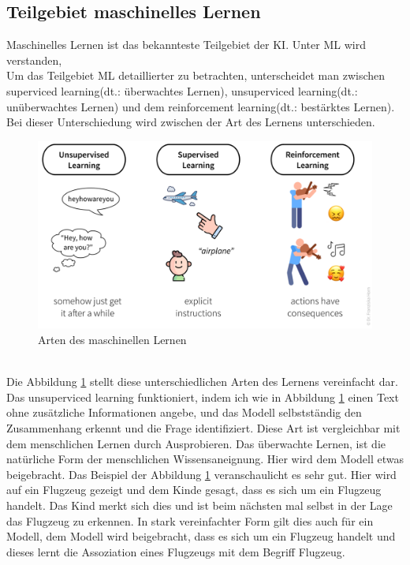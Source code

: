 \begin{onehalfspace}
    \subsection{Teilgebiet maschinelles Lernen}
    \label{subsubsec:teilgebietML}
        Maschinelles Lernen ist das bekannteste Teilgebiet der \ac{KI}. Unter \ac{ML} wird verstanden, 
        \\
        Um das Teilgebiet \ac{ML} detaillierter zu betrachten, unterscheidet man zwischen \glqq{}superviced learning\grqq{}(\ac*{dt}.: überwachtes Lernen), \glqq{}unsuperviced learning\grqq{}(\ac*{dt}.: unüberwachtes Lernen) und dem \glqq{}reinforcement learning\grqq{}(\ac*{dt}.: bestärktes Lernen).\cite{Horn2022}\cite{Datenkommission2019} Bei dieser Unterschiedung wird zwischen der Art des Lernens unterschieden. 
        \\
        \begin{figure}[h]
            \centering
            \includegraphics[width = 12cm]{Bilder/ml_algorithms.png}
            \caption{Arten des maschinellen Lernen\cite{Horn2022}}
            \label{fig:ml_algorithms}
        \end{figure}
        \\
        Die Abbildung \ref*{fig:ml_algorithms} stellt diese unterschiedlichen Arten des Lernens vereinfacht dar. Das unsuperviced learning funktioniert, indem ich wie in Abbildung \ref*{fig:ml_algorithms} einen Text ohne zusätzliche Informationen angebe, und das Modell selbstständig den Zusammenhang erkennt und die Frage identifiziert. Diese Art ist vergleichbar mit dem menschlichen Lernen durch Ausprobieren. 
        Das überwachte Lernen, ist die natürliche Form der menschlichen Wissensaneignung. Hier wird dem Modell etwas beigebracht. Das Beispiel der Abbildung \ref*{fig:ml_algorithms} veranschaulicht es sehr gut. Hier wird auf ein Flugzeug gezeigt und dem Kinde gesagt, dass es sich um ein Flugzeug handelt. Das Kind merkt sich dies und ist beim nächsten mal selbst in der Lage das Flugzeug zu erkennen. In stark vereinfachter Form gilt dies auch für ein Modell, dem Modell wird beigebracht, dass es sich um ein Flugzeug handelt und dieses lernt die Assoziation eines Flugzeugs mit dem Begriff Flugzeug.

\end{onehalfspace}
